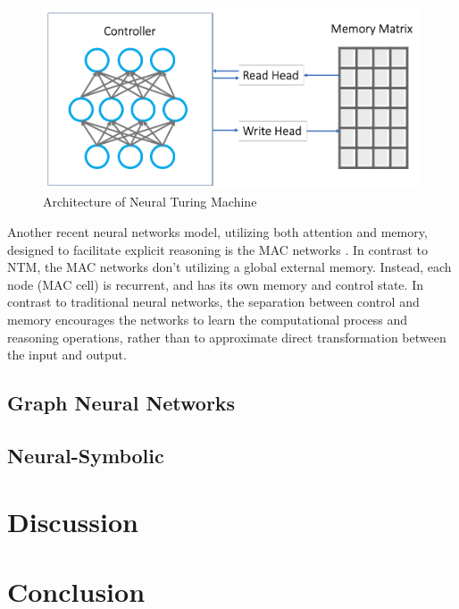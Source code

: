\documentclass[journal]{IEEEtran}
\begin{document}
\begin{figure}[htb]
  \includegraphics[width=\linewidth]{../NTM.png}
  \caption{Architecture of Neural Turing Machine}
  \label{NTM}
\end{figure}

Another recent neural networks model, utilizing both attention and memory, designed to facilitate explicit reasoning is the MAC networks \cite{hudson2018compositional}.
In contrast to NTM, the MAC networks don't utilizing a global external memory. Instead, each node (MAC cell) is recurrent, and has its own memory and control state.
In contrast to traditional neural networks, the separation between control and memory encourages the networks to 
learn the computational process and reasoning operations, rather than to approximate direct transformation between the input and output.

\subsection{Graph Neural Networks}

\subsection{Neural-Symbolic}

\section{Discussion}

\section{Conclusion}



\end{document}

